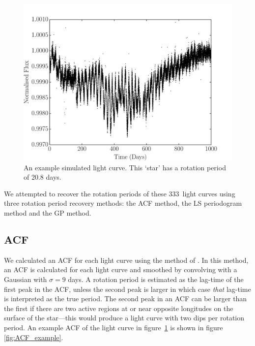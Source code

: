 \documentclass[useAMS, usenatbib, preprint, 12pt]{aastex}
\newcommand{\nlightcurves}{333}
\begin{document}
\begin{figure}
\begin{center}
\includegraphics[width=6in, clip=true]{figures/demo_lc.pdf}
\caption[A simulated light curve.]
{An example simulated light curve. This `star' has a rotation period of 20.8
days.}
\label{fig:demo_lc}
\end{center}
\end{figure}

We attempted to recover the rotation periods of these \nlightcurves\ light
curves using three rotation period recovery methods: the ACF method, the LS
periodogram method and the GP method.

\subsection{ACF}

We calculated an ACF for each light curve using the method of
\citet{Mcquillan2013}.
In this method, an ACF is calculated for each light curve and smoothed by
convolving with a Gaussian with $\sigma=9$ days.
A rotation period is estimated as the lag-time of the first peak in the ACF,
unless the second peak is larger in which case {\it that} lag-time is
interpreted as the true period.
The second peak in an ACF can be larger than the first if there are two active
regions at or near opposite longitudes on the surface of the star---this would
produce a light curve with two dips per rotation period.
An example ACF of the light curve in figure~\ref{fig:demo_lc} is shown
in figure \ref{fig:ACF_example}.
\end{document}
